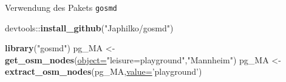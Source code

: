 \documentclass[ignorenonframetext,]{beamer}
\newenvironment{Shaded}{\begin{snugshade}}{\end{snugshade}}
\newcommand{\DataTypeTok}[1]{\textcolor[rgb]{0.74,0.68,0.62}{\underline{#1}}}
\newcommand{\KeywordTok}[1]{\textcolor[rgb]{0.26,0.66,0.93}{\textbf{#1}}}
\newcommand{\NormalTok}[1]{\textcolor[rgb]{0.74,0.68,0.62}{#1}}
\newcommand{\OperatorTok}[1]{\textcolor[rgb]{0.74,0.68,0.62}{#1}}
\newcommand{\StringTok}[1]{\textcolor[rgb]{0.02,0.61,0.04}{#1}}
\begin{document}
\begin{frame}[fragile]{Verwendung des Pakets \texttt{gosmd}}
\protect\hypertarget{verwendung-des-pakets-gosmd}{}

\begin{Shaded}
\begin{Highlighting}[]
\NormalTok{devtools}\OperatorTok{::}\KeywordTok{install_github}\NormalTok{(}\StringTok{"Japhilko/gosmd"}\NormalTok{)}
\end{Highlighting}
\end{Shaded}

\begin{Shaded}
\begin{Highlighting}[]
\KeywordTok{library}\NormalTok{(}\StringTok{"gosmd"}\NormalTok{)}
\NormalTok{pg_MA <-}\StringTok{ }\KeywordTok{get_osm_nodes}\NormalTok{(}\DataTypeTok{object=}\StringTok{"leisure=playground"}\NormalTok{,}\StringTok{"Mannheim"}\NormalTok{)}
\NormalTok{pg_MA <-}\StringTok{ }\KeywordTok{extract_osm_nodes}\NormalTok{(pg_MA,}\DataTypeTok{value=}\StringTok{'playground'}\NormalTok{)}
\end{Highlighting}
\end{Shaded}

\end{frame}
\end{document}
